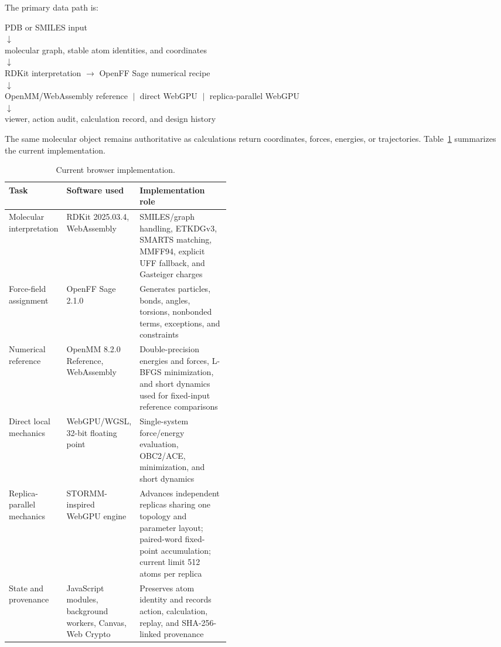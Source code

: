 \documentclass[11pt]{article}
\begin{document}
\begin{small}
The primary data path is:

\begin{center}\small
PDB or SMILES input\\
$\downarrow$\\
molecular graph, stable atom identities, and coordinates\\
$\downarrow$\\
RDKit interpretation $\rightarrow$ OpenFF Sage numerical recipe\\
$\downarrow$\\
OpenMM/WebAssembly reference $\;|\;$ direct WebGPU $\;|\;$ replica-parallel WebGPU\\
$\downarrow$\\
viewer, action audit, calculation record, and design history
\end{center}

The same molecular object remains authoritative as calculations return coordinates, forces, energies, or trajectories. Table~\ref{tab:appA_browser_impl} summarizes the current implementation.

\begin{table}[htbp]
\centering\small
\caption{Current browser implementation.}
\label{tab:appA_browser_impl}
\begin{tabularx}{\linewidth}{@{}p{0.20\linewidth}p{0.24\linewidth}X@{}}
\toprule
\textbf{Task} & \textbf{Software used} & \textbf{Implementation role}\\
\midrule
Molecular interpretation & RDKit 2025.03.4, WebAssembly & SMILES/graph handling, ETKDGv3, SMARTS matching, MMFF94, explicit UFF fallback, and Gasteiger charges\\
Force-field assignment & OpenFF Sage 2.1.0 & Generates particles, bonds, angles, torsions, nonbonded terms, exceptions, and constraints\\
Numerical reference & OpenMM 8.2.0 Reference, WebAssembly & Double-precision energies and forces, L-BFGS minimization, and short dynamics used for fixed-input reference comparisons\\
Direct local mechanics & WebGPU/WGSL, 32-bit floating point & Single-system force/energy evaluation, OBC2/ACE, minimization, and short dynamics\\
Replica-parallel mechanics & STORMM-inspired WebGPU engine & Advances independent replicas sharing one topology and parameter layout; paired-word fixed-point accumulation; current limit 512 atoms per replica\\
State and provenance & JavaScript modules, background workers, Canvas, Web Crypto & Preserves atom identity and records action, calculation, replay, and SHA-256-linked provenance\\
\bottomrule
\end{tabularx}
\end{table}


\end{small}
\end{document}
